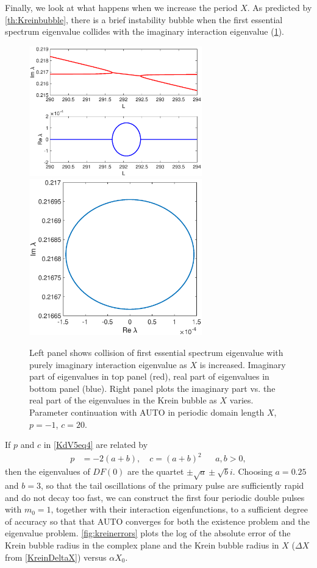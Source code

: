 \documentclass[10pt,reqno]{amsart}
\theoremstyle{plain}
\theoremstyle{definition}
\theoremstyle{remark}
\numberwithin{theorem}{section}
\numberwithin{equation}{section}
\begin{document}
Finally, we look at what happens when we increase the period $X$. As predicted by \cref{th:Kreinbubble}, there is a brief instability bubble when the first essential spectrum eigenvalue collides with the imaginary interaction eigenvalue (\cref{fig:kreinbubble1}).
\begin{figure}[H]
\begin{center}
\includegraphics[width=7.5cm]{images/kreinbubble1}
\includegraphics[width=7.5cm]{images/kreinbubble1zoom.eps}
\end{center}
\caption{Left panel shows collision of first essential spectrum eigenvalue with purely imaginary interaction eigenvalue as $X$ is increased. Imaginary part of eigenvalues in top panel (red), real part of eigenvalues in bottom panel (blue). Right panel plots the imaginary part vs. the real part of the eigenvalues in the Krein bubble as $X$ varies. Parameter continuation with AUTO in periodic domain length $X$, $p = -1$, $c = 20$.}
\label{fig:kreinbubble1}
\end{figure}
\noi If $p$ and $c$ in \cref{KdV5eq4} are related by
\begin{align}\label{KdVpabc}
p &= -2(a+b), \quad c = (a+b)^2 && a, b > 0,
\end{align}
then the eigenvalues of $DF(0)$ are the quartet $\pm \sqrt{a} \pm \sqrt{b} i$. Choosing $a = 0.25$ and $b = 3$, so that the tail oscillations of the primary pulse are sufficiently rapid and do not decay too fast, we can construct the first four periodic double pulses with $m_0 = 1$, together with their interaction eigenfunctions, to a sufficient degree of accuracy so that that AUTO converges for both the existence problem and the eigenvalue problem. \cref{fig:kreinerrors} plots the log of the absolute error of the Krein bubble radius in the complex plane and the Krein bubble radius in $X$ ($\Delta X$ from \cref{KreinDeltaX}) versus $\alpha X_0$. 
\end{document}
